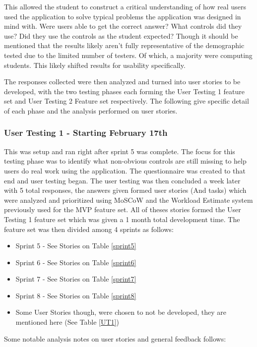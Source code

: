 This allowed the student to construct a critical understanding of how real users used the application to solve typical problems the application was designed in mind with. Were users able to get the correct answer? What controls did they use? Did they use the controls as the student expected? Though it should be mentioned that the results likely aren't fully representative of the demographic tested due to the limited number of testers. Of which, a majority were computing students. This likely shifted results for usability specifically.

The responses collected were then analyzed and turned into user stories to be developed, with the two testing phases each forming the User Testing 1 feature set and User Testing 2 Feature set respectively. The following give specific detail of each phase and the analysis performed on user stories.

\subsubsection{User Testing 1 - Starting February 17th}
This was setup and ran right after sprint 5 was complete. The focus for this testing phase was to identify what non-obvious controls are still missing to help users do real work using the application. The questionnaire was created to that end and user testing began. The user testing was then concluded a week later with 5 total responses, the answers given formed user stories (And tasks) which were analyzed and prioritized using MoSCoW and the Workload Estimate system previously used for the MVP feature set. All of theses stories formed the User Testing 1 feature set which was given a 1 month total development time. The feature set was then divided among 4 sprints as follows:

\begin{itemize}
    \item Sprint 5 - See Stories on Table \ref{sprint5}
    \item Sprint 6 - See Stories on Table \ref{sprint6}
    \item Sprint 7 - See Stories on Table \ref{sprint7}
    \item Sprint 8 - See Stories on Table \ref{sprint8}
    \item Some User Stories though, were chosen to not be developed, they are mentioned here (See Table \ref{UT1})
\end{itemize}

Some notable analysis notes on user stories and general feedback follows:

